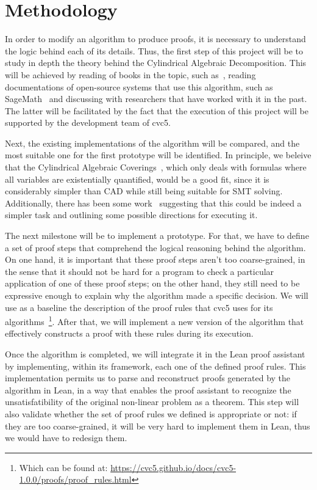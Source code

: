 \documentclass[a4paper, 12pt]{article}
\begin{document}
\section{Methodology}

In order to modify an algorithm to produce proofs, it is necessary to understand the logic behind
each of its details. Thus, the first step of this project will be to study in depth the
theory behind the Cylindrical Algebraic Decomposition. This will be achieved by reading of books in the topic,
such as~\cite{computerAlgebraBook}, reading documentations of open-source systems that use this
algorithm, such as SageMath~\cite{sage} and discussing with researchers that have worked with it in the past.
The latter will be facilitated by the fact that the execution of this project will be supported by the
development team of cvc5.

Next, the existing implementations of the algorithm will be compared, and the most suitable one for the
first prototype will be identified. In principle, we beleive that the Cylindrical Algebraic
Coverings~\cite{coverings}, which only deals with formulas where all variables are existentially quantified,
would be a good fit, since it is considerably simpler than CAD while still being suitable for SMT solving. Additionally, there has been
some work~\cite{proofsCac} suggesting that this could be indeed a simpler task and
outlining some possible directions for executing it.

The next milestone will be to implement a prototype. For that, we have to define a set of proof steps
that comprehend the logical reasoning behind the algorithm. On one hand, it is important that
these proof steps aren't too coarse-grained, in the sense that it should not be hard for a program to check a particular application
of one of these proof steps;
on the other hand, they still need to be expressive enough to explain why the algorithm made a specific decision.
We will use as a baseline the description of the proof rules that cvc5 uses for its algorithms~\footnote{Which can be found at: \href{https://cvc5.github.io/docs/cvc5-1.0.0/proofs/proof\_rules.html}{https://cvc5.github.io/docs/cvc5-1.0.0/proofs/proof\_rules.html}}.
After that, we will implement a new version of the algorithm that effectively constructs a proof with these rules during its execution.

Once the algorithm is completed, we will integrate it in the Lean proof assistant by implementing, within its framework,
each one of the defined proof rules. This implementation permits us to parse and reconstruct proofs generated by the algorithm
in Lean, in a way that enables the proof assistant to recognize the unsatisfatibility of the
original non-linear problem as a theorem. This step will also validate whether the set of proof
rules we defined is appropriate or not: if they are too coarse-grained, it will be very hard to implement them
in Lean, thus we would have to redesign them.
\end{document}
